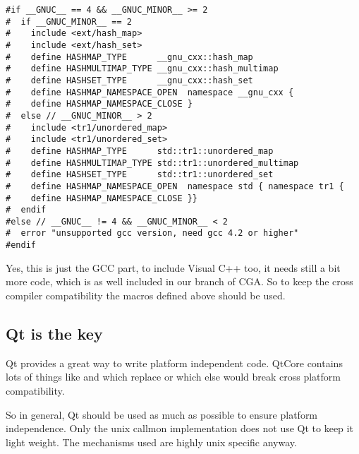 \begin{verbatim}
#if __GNUC__ == 4 && __GNUC_MINOR__ >= 2
#  if __GNUC_MINOR__ == 2
#    include <ext/hash_map>
#    include <ext/hash_set>
#    define HASHMAP_TYPE      __gnu_cxx::hash_map
#    define HASHMULTIMAP_TYPE __gnu_cxx::hash_multimap
#    define HASHSET_TYPE      __gnu_cxx::hash_set
#    define HASHMAP_NAMESPACE_OPEN  namespace __gnu_cxx {
#    define HASHMAP_NAMESPACE_CLOSE }
#  else // __GNUC_MINOR__ > 2
#    include <tr1/unordered_map>
#    include <tr1/unordered_set>
#    define HASHMAP_TYPE      std::tr1::unordered_map
#    define HASHMULTIMAP_TYPE std::tr1::unordered_multimap
#    define HASHSET_TYPE      std::tr1::unordered_set
#    define HASHMAP_NAMESPACE_OPEN  namespace std { namespace tr1 {
#    define HASHMAP_NAMESPACE_CLOSE }}
#  endif
#else // __GNUC__ != 4 && __GNUC_MINOR__ < 2
#  error "unsupported gcc version, need gcc 4.2 or higher"
#endif
\end{verbatim}

Yes, this is just the GCC part, to include Visual C++ too, it needs still a bit more code, which is as well included in our branch of CGA. So to keep the cross compiler compatibility the macros defined above should be used. 

\subsection{Qt is the key}

Qt provides a great way to write platform independent code. QtCore contains lots of things like  and  which replace  or  which else would break cross platform compatibility.

So in general, Qt should be used as much as possible to ensure platform independence. Only the unix callmon implementation does not use Qt to keep it light weight. The mechanisms used are highly unix specific anyway. 
